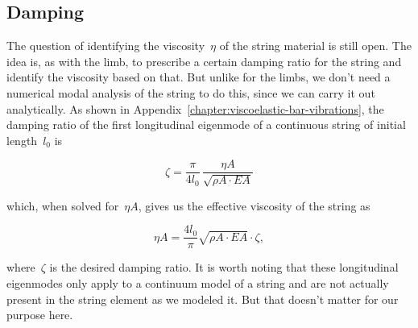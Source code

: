 \newpage
\subsection{Damping}

The question of identifying the viscosity~$\eta$ of the string material is still open.
The idea is, as with the limb, to prescribe a certain damping ratio for the string and identify the viscosity based on that.
But unlike for the limbs, we don't need a numerical modal analysis of the string to do this, since we can carry it out analytically.
As shown in Appendix~\ref{chapter:viscoelastic-bar-vibrations}, the damping ratio of the first longitudinal eigenmode of a continuous string of initial length~$l_0$ is

\begin{equation}
\zeta = \frac{\pi}{4l_0}\,\frac{\eta A}{\sqrt{\rho A \cdot EA}}
\end{equation}

which, when solved for~$\eta A$, gives us the effective viscosity of the string as

\begin{equation}
\eta A = \frac{4l_0}{\pi}\sqrt{\rho A \cdot EA}\cdot\zeta,
\end{equation}

where~$\zeta$ is the desired damping ratio.
It is worth noting that these longitudinal eigenmodes only apply to a continuum model of a string and are not actually present in the string element as we modeled it.
But that doesn't matter for our purpose here.